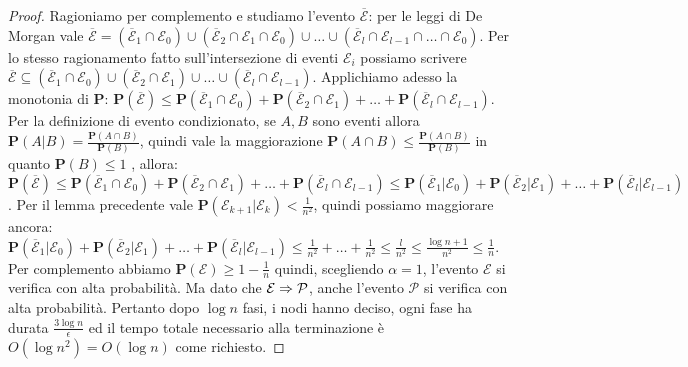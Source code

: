 \documentclass{article}
\begin{document}
\begin{proof}
    Ragioniamo per 
    complemento e studiamo l'evento $\overline{\mathcal{E}}$: per le 
    leggi di De Morgan vale $\overline{\mathcal{E}} = (\overline{\mathcal{E}}_1
    \cap \mathcal{E}_0) \cup (\overline{\mathcal{E}}_2
    \cap \mathcal{E}_1 \cap \mathcal{E}_0) \cup \ldots \cup 
    (\overline{\mathcal{E}}_l \cap \mathcal{E}_{l-1} \cap \ldots
    \cap \mathcal{E}_0)$. Per lo stesso ragionamento fatto sull'intersezione di
    eventi $\mathcal{E}_i$ possiamo scrivere $\overline{\mathcal{E}} \subseteq
    (\overline{\mathcal{E}}_1
    \cap \mathcal{E}_0) \cup (\overline{\mathcal{E}}_2
    \cap \mathcal{E}_1 ) \cup \ldots \cup 
    (\overline{\mathcal{E}}_l \cap \mathcal{E}_{l-1})$. Applichiamo adesso 
    la monotonia di $\mathbf{P}$: $\mathbf{P}(\overline{\mathcal{E}}) \leq
    \mathbf{P}(\overline{\mathcal{E}}_1
    \cap \mathcal{E}_0) + \mathbf{P}(\overline{\mathcal{E}}_2
    \cap \mathcal{E}_1 ) + \ldots + 
    \mathbf{P}(\overline{\mathcal{E}}_l \cap \mathcal{E}_{l-1})$. Per la 
    definizione di evento condizionato, se $A,B$ sono eventi allora $
    \mathbf{P}(A|B) = \frac{\mathbf{P}(A\cap B)}{\mathbf{P}(B)}$, quindi vale 
    la maggiorazione ${\mathbf{P}(A\cap B)} \leq 
    \frac{\mathbf{P}(A\cap B)}{\mathbf{P}(B)}$ in quanto $\mathbf{P}(B) \leq 1$
    , allora: 
    $\mathbf{P}(\overline{\mathcal{E}}) \leq
    \mathbf{P}(\overline{\mathcal{E}}_1
    \cap \mathcal{E}_0) + \mathbf{P}(\overline{\mathcal{E}}_2
    \cap \mathcal{E}_1 ) + \ldots + 
    \mathbf{P}(\overline{\mathcal{E}}_l \cap \mathcal{E}_{l-1}) \leq
    \mathbf{P}(\overline{\mathcal{E}}_1
    | \mathcal{E}_0) + \mathbf{P}(\overline{\mathcal{E}}_2
    | \mathcal{E}_1 ) + \ldots + 
    \mathbf{P}(\overline{\mathcal{E}}_l | \mathcal{E}_{l-1})$. Per il 
    lemma precedente vale $\mathbf{P}(\mathcal{E}_{k+1}|
    \mathcal{E}_{k}) < \frac{1}{n^2}$, quindi possiamo maggiorare ancora:
    $\mathbf{P}(\overline{\mathcal{E}}_1
    | \mathcal{E}_0) + \mathbf{P}(\overline{\mathcal{E}}_2
    | \mathcal{E}_1 ) + \ldots + 
    \mathbf{P}(\overline{\mathcal{E}}_l | \mathcal{E}_{l-1}) \leq 
    \frac{1}{n^2} + \ldots + \frac{1}{n^2} \leq \frac{l}{n^2} \leq 
    \frac{\log{n} + 1}{n^2} \leq \frac{1}{n}$. Per complemento abbiamo 
    $\mathbf{P}(\mathcal{E}) \geq 1 - \frac{1}{n}$ quindi, scegliendo $\alpha
    = 1$, l'evento $\mathcal{E}$ si verifica con alta probabilit\`a. Ma
    dato che $\mathcal{E} \Rightarrow \mathcal{P}$, anche l'evento $
    \mathcal{P}$ si verifica con alta probabilit\`a. Pertanto dopo $\log{n}$
    fasi, i nodi hanno deciso, ogni fase ha durata $\frac{3\log{n}}{\epsilon}$
    ed il tempo totale necessario alla terminazione \`e $O(\log{n}^2) = 
    O(\log{n})$ come richiesto.
\end{proof}

\end{document}
